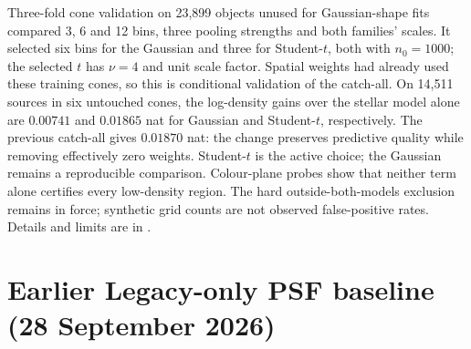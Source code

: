 \documentclass[11pt,a4paper]{article}
\begin{document}
Three-fold cone validation on 23,899 objects unused for Gaussian-shape fits
compared 3, 6 and 12 bins, three pooling strengths and both families' scales.
It selected six bins for the Gaussian and three for Student-$t$, both with
$n_0=1000$; the selected $t$ has $\nu=4$ and unit scale factor. Spatial weights
had already used these training cones, so this is conditional validation of
the catch-all. On 14,511 sources in six untouched cones, the log-density gains
over the stellar model alone are $0.00741$ and $0.01865$ nat for Gaussian and
Student-$t$, respectively. The previous catch-all gives $0.01870$ nat: the
change preserves predictive quality while removing effectively zero weights.
Student-$t$ is the active choice; the Gaussian remains a reproducible
comparison. Colour-plane probes show that neither term alone certifies every
low-density region. The hard outside-both-models exclusion remains in force;
synthetic grid counts are not observed false-positive rates. Details and
limits are in .

\section*{Earlier Legacy-only PSF baseline (28 September 2026)}
\end{document}
